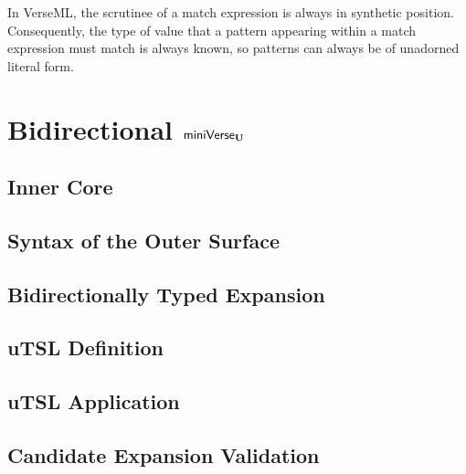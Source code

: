 In VerseML, the scrutinee of a match expression is always in synthetic position. Consequently, the type of value that a pattern appearing within a match expression must match is always known, so patterns can always be of unadorned literal form.
\section{Bidirectional $\mathsf{miniVerse}_\textbf{U}$}\label{sec:b-miniverse}
\subsection{Inner Core}
\subsection{Syntax of the Outer Surface}
\subsection{Bidirectionally Typed Expansion}
\subsection{uTSL Definition}
\subsection{uTSL Application}
\subsection{Candidate Expansion Validation}
